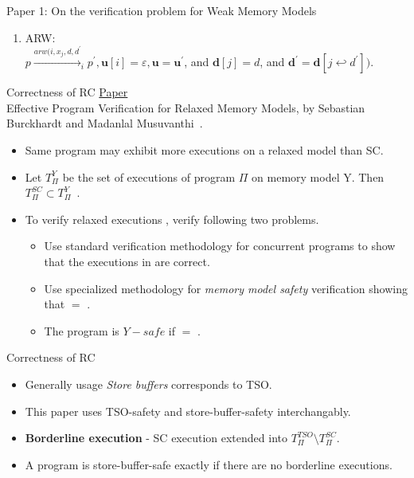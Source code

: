 \documentclass[9pt]{beamer}
\begin{document}
\begin{frame}{Paper 1: On the verification problem for Weak Memory Models}
\begin{itemize}
\begin{itemize}
\begin{enumerate}
						(Read own write): $\exists u_1, u_2 \in B_i^*.(\mathbf{u}[i] = u_1(i,j,d)u_2$ and
															$\forall (i,k,d^{\prime}) \in u_1.k \neq j)$.
			\vspace{2mm}
			\item ARW:\\
			\vspace{2mm}
			$p \overset{arw(i,x_j,d,d^{\prime}}{\longrightarrow}_i p^{\prime}, \mathbf{u}[i] = \varepsilon, \mathbf{u} = \mathbf{u}^{\prime}$,
					and $\mathbf{d}[j] = d$, and $\mathbf{d}^{\prime} = \mathbf{d}[j \hookleftarrow d^{\prime}])$.
			\end{enumerate}
\end{itemize}
\end{itemize}
\end{frame}

\begin{frame}{Correctness of RC}
\underline{Paper}\\
Effective Program Verification for Relaxed Memory Models, by Sebastian Burckhardt and
Madanlal Musuvanthi~\cite{Burckhardt2008}.
\begin{itemize}
\item Same program may exhibit more executions on
      a relaxed model than SC.
\item Let $T_{\Pi}^Y$ be the set of executions of program $\Pi$ on memory model Y.
        Then $T_{\Pi}^{SC} \subset T_{\Pi}^Y$~.
\item To verify relaxed executions \rlxset{}, verify following two problems.
  \begin{itemize}
  \item Use standard verification methodology for concurrent programs to show that
        the executions in \scset{} are correct.
  \item Use specialized methodology for {\em memory model safety} verification
        showing that \rlxset{} $=$ \scset{}.
  \item The program is $Y-safe$  if \rlxset{} $=$ \scset{}.
  \end{itemize}
\end{itemize}
\end{frame}

\begin{frame}{Correctness of RC~}
\begin{itemize}
\item Generally usage {\em Store buffers} corresponds to TSO.
\item This paper uses TSO-safety and store-buffer-safety interchangably.
\item \textbf{Borderline execution} - SC execution extended into $T_{\Pi}^{TSO} \setminus  T_{\Pi}^{SC}$.
\item A program is store-buffer-safe exactly if there are no borderline executions.
\end{itemize}

\end{frame}
\end{document}
